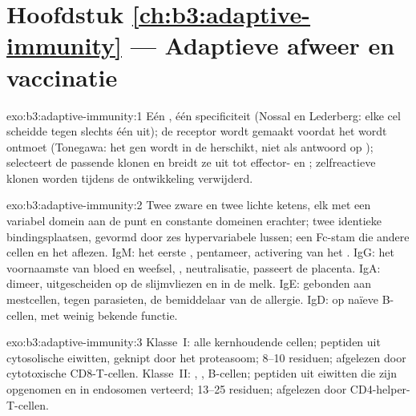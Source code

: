 \section*{Hoofdstuk \ref{ch:b3:adaptive-immunity} --- Adaptieve afweer en vaccinatie}

\begin{solution}{exo:b3:adaptive-immunity:1}
Eén , één specificiteit (Nossal en Lederberg: elke cel scheidde
 tegen slechts één  uit); de receptor wordt gemaakt
voordat het  wordt ontmoet (Tonegawa: het gen wordt in de 
herschikt, niet als antwoord op );  selecteert de
passende klonen en breidt ze uit tot effector- en ;
zelfreactieve klonen worden tijdens de ontwikkeling verwijderd.
\end{solution}

\begin{solution}{exo:b3:adaptive-immunity:2}
Twee zware en twee lichte ketens, elk met een variabel domein aan de
punt en constante domeinen erachter; twee identieke bindingsplaatsen,
gevormd door zes hypervariabele lussen; een Fc-stam die andere cellen en
het  aflezen. IgM: het eerste , pentameer,
activering van het . IgG: het voornaamste  van
bloed en weefsel, , neutralisatie, passeert de placenta.
IgA: dimeer, uitgescheiden op de slijmvliezen en in de melk. IgE:
gebonden aan mestcellen, tegen parasieten, de bemiddelaar van de
allergie. IgD: op naïeve B-cellen, met weinig bekende functie.
\end{solution}

\begin{solution}{exo:b3:adaptive-immunity:3}
Klasse~I: alle kernhoudende cellen; peptiden uit cytosolische eiwitten,
geknipt door het proteasoom; 8--10 residuen; afgelezen door cytotoxische
CD8-T-cellen. Klasse~II: , , B-cellen;
peptiden uit eiwitten die zijn opgenomen en in endosomen verteerd;
13--25 residuen; afgelezen door CD4-helper-T-cellen.
\end{solution}

